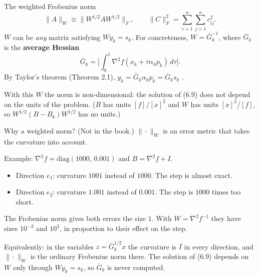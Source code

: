 \documentclass[aspectratio=169,12pt]{beamer}
\newcommand{\hessf}{\nabla^{2} f}
\newcommand{\Gbar}{\bar{G}}
\newcommand{\eqn}[1]{\text{\small(#1)}}
\newcommand{\notinbook}{{\small(Not in the book.)}}
\begin{document}
\begin{frame}{The weighted Frobenius norm}
  \[
    \|A\|_{W}\equiv\big\|W^{1/2}AW^{1/2}\big\|_{F},
    \qquad \|C\|_{F}^{2}=\textstyle\sum_{i=1}^{n}\sum_{j=1}^{n}c_{ij}^{2} .
    \tag{6.10}
  \]
  $W$ can be \emph{any} matrix satisfying $Wy_{k}=s_{k}$.
  For concreteness, $W=\Gbar_{k}^{-1}$, where $\Gbar_{k}$ is the \textbf{average Hessian}
  \[ \Gbar_{k}=\Big[\int_{0}^{1}\hessf(x_{k}+\tau\alpha_{k}p_{k})\,d\tau\Big] . \tag{6.11} \]
  By Taylor's theorem (Theorem 2.1),\quad
  $y_{k}=\Gbar_{k}\alpha_{k}p_{k}=\Gbar_{k}s_{k}$ \eqn{6.12}.

  \vspace{0.5em}
  With this $W$ the norm is non-dimensional: the solution of (6.9) does not depend on the
  units of the problem. ($B$ has units $[f]/[x]^{2}$ and $W$ has units $[x]^{2}/[f]$, so
  $W^{1/2}(B-B_{k})W^{1/2}$ has no units.)
\end{frame}

\begin{frame}{Why a weighted norm? \notinbook}
  $\|\cdot\|_{W}$ is an error metric that takes the curvature into account.

  \vspace{0.4em}
  Example: $\hessf=\mathrm{diag}(1000,\,0.001)$ and $B=\hessf+I$.
  \begin{itemize}\setlength\itemsep{0.3em}
    \item Direction $e_{1}$: curvature $1001$ instead of $1000$. The step is almost exact.
    \item Direction $e_{2}$: curvature $1.001$ instead of $0.001$. The step is $1000$ times too short.
  \end{itemize}
  The Frobenius norm gives both errors the size $1$. With $W=\hessf^{-1}$ they have sizes
  $10^{-3}$ and $10^{3}$, in proportion to their effect on the step.

  \vspace{0.4em}
  Equivalently: in the variables $z=\Gbar_{k}^{1/2}x$ the curvature is $I$ in every direction, and
  $\|\cdot\|_{W}$ is the ordinary Frobenius norm there.
  The solution of (6.9) depends on $W$ only through $Wy_{k}=s_{k}$, so $\Gbar_{k}$ is never computed.
\end{frame}
\end{document}
